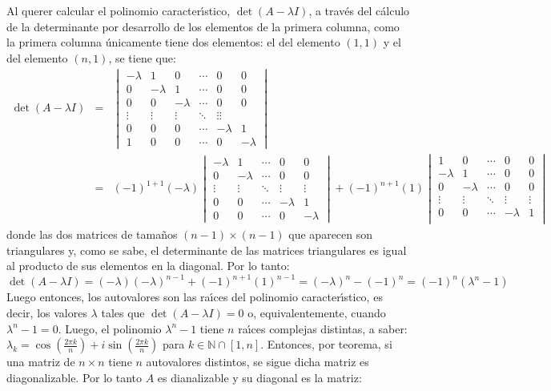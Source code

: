\begin{solucion}
 Al querer calcular el polinomio caracter\'{\i}stico, $\det(A-\lambda I)$, a trav\'es del c\'alculo de la determinante por desarrollo de los elementos de la primera columna, como la primera columna \'unicamente tiene dos elementos: el del elemento  $(1,1)$ y el del elemento $(n,1)$, se tiene que:
 \begin{eqnarray*}
 \det(A-\lambda I) & = & 
  \begin{vmatrix}
   -\lambda & 1 & 0 & \cdots & 0 & 0 \\
   0 & -\lambda & 1 & \cdots & 0 & 0 \\
   0 & 0 & -\lambda & \cdots & 0 & 0 \\
   \vdots & \vdots & \vdots & \ddots & \vdots \vdots \\
   0 & 0 & 0 & \cdots & -\lambda & 1 \\
   1 & 0 & 0 & \cdots & 0 & -\lambda
  \end{vmatrix} \\
  & = & 
  (-1)^{1+1}(-\lambda)
  \begin{vmatrix}
   -\lambda & 1 & \cdots & 0 & 0 \\
   0 & -\lambda & \cdots & 0 & 0 \\
   \vdots & \vdots & \ddots & \vdots & \vdots \\
   0 & 0 & \cdots & -\lambda & 1 \\
   0 & 0 & \cdots & 0 & -\lambda 
  \end{vmatrix}
  +(-1)^{n+1}(1)
  \begin{vmatrix}
   1 & 0 & \cdots & 0 & 0 \\
   -\lambda & 1 & \cdots & 0 & 0 \\
   0 & -\lambda & \cdots & 0 & 0 \\
   \vdots & \vdots & \ddots & \vdots & \vdots \\
   0 & 0 & \cdots & -\lambda & 1 \\
  \end{vmatrix}
 \end{eqnarray*}
 donde las dos matrices de tama\~nos $(n-1)\times (n-1)$ que aparecen son triangulares y, como se sabe, el determinante de las matrices triangulares es igual al producto de sus elementos en la diagonal. Por lo tanto:
 \begin{equation*}
  \det(A - \lambda I) = (-\lambda)(-\lambda)^{n-1} + (-1)^{n+1}(1)^{n-1} = (-\lambda)^{n} - (-1)^{n} = (-1)^{n}(\lambda^n - 1)
 \end{equation*}
 Luego entonces, los autovalores son las ra\'{\i}ces del polinomio caracter\'{\i}stico, es decir, los valores $\lambda$ tales que $\det(A - \lambda I) = 0$ o, equivalentemente, cuando $\lambda^n - 1 = 0$. Luego, el polinomio $\lambda^n - 1$ tiene $n$ ra\'{\i}ces complejas distintas, a saber: $\lambda_{k} = \cos\left(\frac{2\pi k}{n} \right) + i\sin\left(\frac{2\pi k}{n} \right)$ para $k \in \mathbb{N}\cap[1,n]$. Entonces, por teorema, si una matriz de $n\times n$ tiene $n$ autovalores distintos, se sigue dicha matriz es diagonalizable. Por lo tanto $A$ es dianalizable y su diagonal es la matriz:

\end{solucion}
